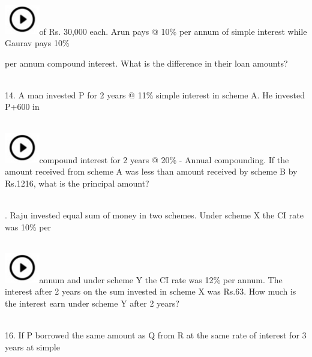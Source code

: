 \documentclass{article}
\begin{document}
	\noindent \\ \includegraphics*[width=0.60in, height=0.52in]{images/image1}of Rs. 30,000 each. Arun pays @ 10\% per annum of simple interest while Gaurav pays 10\%
	
	\noindent per annum compound interest. What is the difference in their loan amounts?
	
	\noindent 
	
	\noindent 
	
	\noindent  \\ 
	
	14. A man invested P for 2 years @ 11\% simple interest in scheme A. He invested P+600 in  
	 
	\noindent \\ \includegraphics*[width=0.60in, height=0.52in]{images/image1}compound interest for 2 years @ 20\% - Annual compounding. If the amount received from scheme  A  was less than amount received by scheme B by Rs.1216, what is the principal  amount?
	
	\noindent 
	
	\noindent  \\ 
	
	. Raju invested equal sum of money in two schemes. Under scheme X the CI rate was 10\% per
	
	\noindent 
	
	\noindent  
	 
	\noindent \\ \includegraphics*[width=0.60in, height=0.52in]{images/image1}annum and under scheme Y the CI rate was 12\% per annum. The interest after 2 years on the sum invested in scheme X was Rs.63. How much is the interest earn under scheme Y after 2 years?
	
	\noindent 
	
	\noindent 
	
	\noindent  \\ 
	
	16. If P borrowed the same amount as Q from R at the same rate of interest for 3 years at simple  
	 
\end{document}

